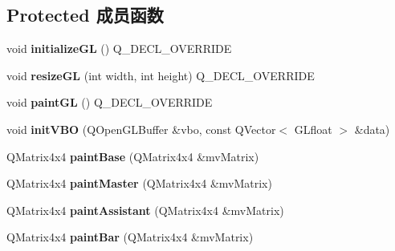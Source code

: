 \subsection*{Protected 成员函数}
\begin{DoxyCompactItemize}
\item 
\hypertarget{class_view_a30c0d555aa48a2d581238f6e12c500a1}{}void {\bfseries initialize\+G\+L} () Q\+\_\+\+D\+E\+C\+L\+\_\+\+O\+V\+E\+R\+R\+I\+D\+E\label{class_view_a30c0d555aa48a2d581238f6e12c500a1}

\item 
\hypertarget{class_view_af2c68923c2b1775a38529ba49f99877d}{}void {\bfseries resize\+G\+L} (int width, int height) Q\+\_\+\+D\+E\+C\+L\+\_\+\+O\+V\+E\+R\+R\+I\+D\+E\label{class_view_af2c68923c2b1775a38529ba49f99877d}

\item 
\hypertarget{class_view_a4054f0018a33be8db2a2d048e8e79e14}{}void {\bfseries paint\+G\+L} () Q\+\_\+\+D\+E\+C\+L\+\_\+\+O\+V\+E\+R\+R\+I\+D\+E\label{class_view_a4054f0018a33be8db2a2d048e8e79e14}

\item 
\hypertarget{class_view_a1ec6a49f56472d12f37c4a2fccc62392}{}void {\bfseries init\+V\+B\+O} (Q\+Open\+G\+L\+Buffer \&vbo, const Q\+Vector$<$ G\+Lfloat $>$ \&data)\label{class_view_a1ec6a49f56472d12f37c4a2fccc62392}

\item 
\hypertarget{class_view_a918d2a4cd065811dfc7e4e513a1cc3b9}{}Q\+Matrix4x4 {\bfseries paint\+Base} (Q\+Matrix4x4 \&mv\+Matrix)\label{class_view_a918d2a4cd065811dfc7e4e513a1cc3b9}

\item 
\hypertarget{class_view_aaac6dd800eb6b65b9c87260c38633708}{}Q\+Matrix4x4 {\bfseries paint\+Master} (Q\+Matrix4x4 \&mv\+Matrix)\label{class_view_aaac6dd800eb6b65b9c87260c38633708}

\item 
\hypertarget{class_view_acd84d7f155e50a5d4e628f2726053ad3}{}Q\+Matrix4x4 {\bfseries paint\+Assistant} (Q\+Matrix4x4 \&mv\+Matrix)\label{class_view_acd84d7f155e50a5d4e628f2726053ad3}

\item 
\hypertarget{class_view_ab6483d3456cd0b1b49b35012dca4c10d}{}Q\+Matrix4x4 {\bfseries paint\+Bar} (Q\+Matrix4x4 \&mv\+Matrix)\label{class_view_ab6483d3456cd0b1b49b35012dca4c10d}

\end{DoxyCompactItemize}


